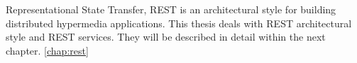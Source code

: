 Representational State Transfer, REST is an architectural style for building distributed hypermedia applications. This thesis deals with REST architectural style and REST services. They will be described in detail within the next chapter. \ref{chap:rest}



    

